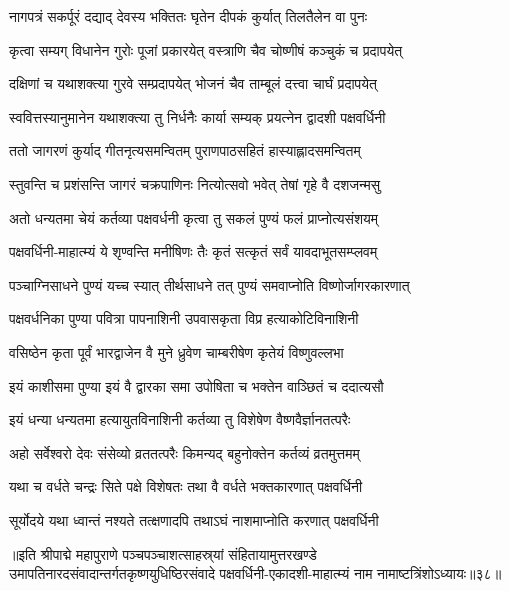 \twolineshloka
{नागपत्रं सकर्पूरं दद्याद् देवस्य भक्तितः}
{घृतेन दीपकं कुर्यात् तिलतैलेन वा पुनः}%

\twolineshloka
{कृत्वा सम्यग् विधानेन गुरोः पूजां प्रकारयेत्}
{वस्त्राणि चैव चोष्णीषं कञ्चुकं च प्रदापयेत्}%

\twolineshloka
{दक्षिणां च यथाशक्त्या गुरवे सम्प्रदापयेत् }
{भोजनं चैव ताम्बूलं दत्त्वा चार्घं प्रदापयेत्}%

\twolineshloka
{स्ववित्तस्यानुमानेन यथाशक्त्या तु निर्धनैः}
{कार्या सम्यक् प्रयत्नेन द्वादशी पक्षवर्धिनी}%

\twolineshloka
{ततो जागरणं कुर्याद् गीतनृत्यसमन्वितम्}
{पुराणपाठसहितं हास्याह्लादसमन्वितम्}%

\twolineshloka
{स्तुवन्ति च प्रशंसन्ति जागरं चक्रपाणिनः}
{नित्योत्सवो भवेत् तेषां गृहे वै दशजन्मसु}%

\twolineshloka
{अतो धन्यतमा चेयं कर्तव्या पक्षवर्धनी}
{कृत्वा तु सकलं पुण्यं फलं प्राप्नोत्यसंशयम्}%

\twolineshloka
{पक्षवर्धिनी-माहात्म्यं ये शृण्वन्ति मनीषिणः}
{तैः कृतं सत्कृतं सर्वं यावदाभूतसम्प्लवम्}%

\twolineshloka
{पञ्चाग्निसाधने पुण्यं यच्च स्यात् तीर्थसाधने}
{तत् पुण्यं समवाप्नोति विष्णोर्जागरकारणात्}%

\twolineshloka
{पक्षवर्धनिका पुण्या पवित्रा पापनाशिनी}
{उपवासकृता विप्र हत्याकोटिविनाशिनी}%

\twolineshloka
{वसिष्ठेन कृता पूर्वं भारद्वाजेन वै मुने}
{ध्रुवेण चाम्बरीषेण कृतेयं विष्णुवल्लभा}%

\twolineshloka
{इयं काशीसमा पुण्या इयं वै द्वारका समा}
{उपोषिता च भक्तेन वाञ्छितं च ददात्यसौ}%

\twolineshloka
{इयं धन्या धन्यतमा हत्यायुतविनाशिनी}
{कर्तव्या तु विशेषेण वैष्णवैर्ज्ञानतत्परैः}%

\twolineshloka
{अहो सर्वेश्वरो देवः संसेव्यो व्रततत्परैः}
{किमन्यद् बहुनोक्तेन कर्तव्यं व्रतमुत्तमम्}%

\twolineshloka
{यथा च वर्धते चन्द्रः सिते पक्षे विशेषतः}
{तथा वै वर्धते भक्तकारणात् पक्षवर्धिनी}%

\twolineshloka
{सूर्योदये यथा ध्वान्तं नश्यते तत्क्षणादपि}
{तथाऽघं नाशमाप्नोति करणात् पक्षवर्धिनी}%

॥इति श्रीपाद्मे महापुराणे पञ्चपञ्चाशत्साहस्र्यां संहितायामुत्तरखण्डे उमापतिनारदसंवादान्तर्गतकृष्णयुधिष्ठिरसंवादे पक्षवर्धिनी-एकादशी-माहात्म्यं नाम नामाष्टत्रिंशोऽध्यायः॥३८॥

\genMangalaShloka

